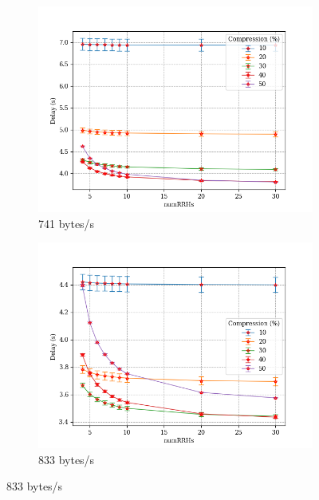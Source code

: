 \documentclass[11pt,a4paper,oneside, openright]{article}
\begin{document}
\begin{figure}[H]
	\centering
	\begin{subfigure}{.5\textwidth}
		\centering
		\includegraphics[width=\linewidth]{images/n-vs-delay-s-741}
		\caption{741 bytes/s}
		\label{fig:n-vs-delay-s-741}
	\end{subfigure}%
	\begin{subfigure}{.5\textwidth}
		\centering
		\includegraphics[width=\linewidth]{images/n-vs-delay-s-833}
		\caption{833 bytes/s}
		\label{fig:n-vs-delay-s-833}
	\end{subfigure}%
	

\end{figure}
\end{document}
